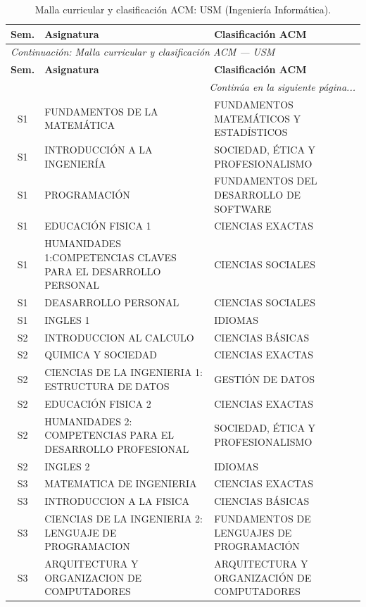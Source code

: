 \documentclass[11pt,a4paper]{article}
\begin{document}
\begin{small}
\begin{longtable}{c >{\raggedright\arraybackslash}p{8.5cm} >{\raggedright\arraybackslash}p{5.5cm}}
\caption{Malla curricular y clasificación ACM: USM (Ingeniería Informática).} \label{tab:USM08} \\
\toprule
\textbf{Sem.} & \textbf{Asignatura} & \textbf{Clasificación ACM} \\
\midrule
\endfirsthead
\multicolumn{3}{l}{\small\textit{Continuación: Malla curricular y clasificación ACM --- USM}} \\[3pt]
\toprule
\textbf{Sem.} & \textbf{Asignatura} & \textbf{Clasificación ACM} \\
\midrule
\endhead
\midrule
\multicolumn{3}{r}{\small\textit{Continúa en la siguiente página...}} \\
\endfoot
\bottomrule
\endlastfoot
S1 & FUNDAMENTOS DE LA MATEMÁTICA & FUNDAMENTOS MATEMÁTICOS Y ESTADÍSTICOS \\
S1 & INTRODUCCIÓN A LA INGENIERÍA & SOCIEDAD, ÉTICA Y PROFESIONALISMO \\
S1 & PROGRAMACIÓN & FUNDAMENTOS DEL DESARROLLO DE SOFTWARE \\
S1 & EDUCACIÓN FISICA 1 & CIENCIAS EXACTAS \\
S1 & HUMANIDADES 1:COMPETENCIAS CLAVES PARA EL DESARROLLO PERSONAL & CIENCIAS SOCIALES \\
S1 & DEASARROLLO PERSONAL & CIENCIAS SOCIALES \\
S1 & INGLES 1 & IDIOMAS \\
S2 & INTRODUCCION AL CALCULO & CIENCIAS BÁSICAS \\
S2 & QUIMICA Y SOCIEDAD & CIENCIAS EXACTAS \\
S2 & CIENCIAS DE LA INGENIERIA 1: ESTRUCTURA DE DATOS & GESTIÓN DE DATOS \\
S2 & EDUCACIÓN FISICA 2 & CIENCIAS EXACTAS \\
S2 & HUMANIDADES 2: COMPETENCIAS PARA EL DESARROLLO PROFESIONAL & SOCIEDAD, ÉTICA Y PROFESIONALISMO \\
S2 & INGLES 2 & IDIOMAS \\
S3 & MATEMATICA DE INGENIERIA & CIENCIAS EXACTAS \\
S3 & INTRODUCCION A LA FISICA & CIENCIAS BÁSICAS \\
S3 & CIENCIAS DE LA INGENIERIA 2: LENGUAJE DE PROGRAMACION & FUNDAMENTOS DE LENGUAJES DE PROGRAMACIÓN \\
S3 & ARQUITECTURA Y ORGANIZACION DE COMPUTADORES & ARQUITECTURA Y ORGANIZACIÓN DE COMPUTADORES \\

\end{longtable}
\end{small}
\end{document}
